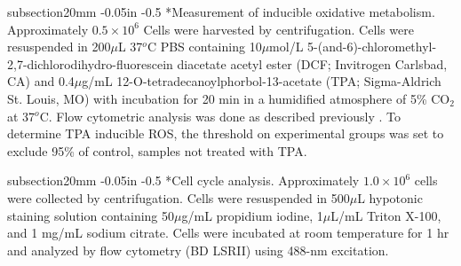 \documentclass[12pt]{article}
\makeatletter
\renewcommand\subsection{\@startsection
	{subsection}{2}{0mm}
	{-0.05in}
	{-0.5\baselineskip}
	{\normalfont\normalsize\bfseries}}
\makeatother
\begin{document}
\subsection*{Measurement of inducible oxidative metabolism.}
Approximately $0.5\times10^6$ Cells were harvested by centrifugation.
Cells were resuspended in 200$\mu$L 37$^{o}$C PBS containing 10$\mu$mol/L 
5-(and-6)-chloromethyl-2,7-dichlorodihydro-fluorescein diacetate acetyl ester (DCF; Invitrogen Carlsbad, CA) 
and 0.4$\mu$g/mL 12-O-tetradecanoylphorbol-13-acetate (TPA; Sigma-Aldrich St. Louis, MO)
with incubation for 20 min in a humidified atmosphere of 5\% CO$_2$ at 37$^{o}$C. 
Flow cytometric analysis was done as described previously \cite{Reiterer2007}.
To determine TPA inducible ROS, the threshold on experimental groups was set to exclude 95\% of control,
samples not treated with TPA.  

\subsection*{Cell cycle analysis.}
Approximately $1.0\times10^6$ cells were collected by centrifugation.
Cells were resuspended in 500$\mu$L hypotonic staining solution containing 50$\mu$g/mL propidium iodine, 
1$\mu$L/mL Triton X-100, and 1 mg/mL sodium citrate. 
Cells were incubated at room temperature for 1 hr and analyzed by flow cytometry (BD LSRII) using 488-nm excitation.
\end{document}
